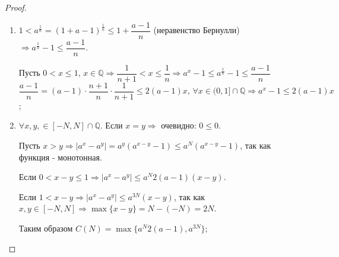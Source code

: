 \documentclass[12pt]{article}
\newcommand{\MQ}{\mathbb{Q}}
\theoremstyle{definition}
\begin{document}
\begin{proof}\hfill
	\begin{enumerate}[label={\arabic*)}]
		\item $1 < a^\frac{1}{n} =(1 + a - 1)^\frac{1}{n} \leq 1 + \dfrac{a - 1}{n}$ (неравенство Бернулли) $\Rightarrow a^\frac{1}{n} - 1 \leq \dfrac{a - 1}{n}$.
		
		Пусть $0 < x \leq 1, \, x \in \MQ \Rightarrow \dfrac{1}{n+1} < x \leq \dfrac{1}{n} \Rightarrow a^x - 1 \leq a^\frac{1}{n} -1 \leq \dfrac{a-1}{n}$ \\
		$\dfrac{a-1}{n} = (a-1){\cdot}\dfrac{n+1}{n}{\cdot}\dfrac{1}{n+1} \leq 2 (a-1) x, \, \forall x \in (0,1] \cap \MQ \Rightarrow a^x - 1 \leq 2(a-1)x$;
		\item $\forall x,y, \in [-N, N] \cap \MQ$. Если $x = y \Rightarrow$ очевидно: $0 \leq 0$. 
		
		Пусть $x > y \Rightarrow |a^x - a^y| = a^y(a^{x-y} - 1) \leq a^N(a^{x-y} -1)$, так как функция - монотонная.
		
		Если $0 < x - y \leq 1 \Rightarrow |a^x - a^y| \leq a^N 2(a-1)(x-y)$.
		
		Если $1 < x-y \Rightarrow |a^x - a^y| \leq a^{3N}(x-y)$, так как $x,y \in [-N,N] \Rightarrow \max\{x-y\} = N - (-N) = 2N$. 
		
		Таким образом $C(N) = \max\{a^N2(a-1), a^{3N}\}$;
	\end{enumerate}
\end{proof}
\end{document}

